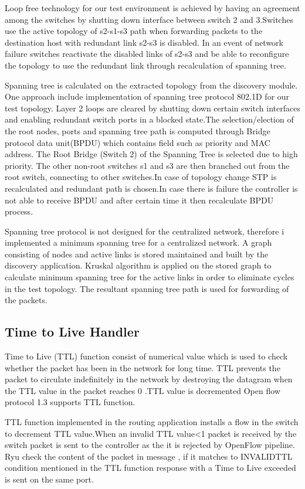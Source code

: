 Loop free technology for our test environment is achieved by having an agreement among the switches by shutting down interface between switch 2 and 3.Switches use the active topology of s2-s1-s3 path when forwarding packets to the destination host with redundant link s2-s3 is disabled. In an event of network failure switches reactivate the disabled links of s2-s3 and be able to reconfigure the topology to use the redundant link through recalculation of spanning tree.

Spanning tree is calculated on the extracted topology from the discovery module. One approach include implementation of spanning tree protocol 802.1D for our test topology. Layer 2 loops are cleared by shutting down certain switch interfaces and enabling redundant switch ports in a blocked state.The selection/election of the root nodes, ports and spanning tree path is computed through Bridge protocol data unit(BPDU) which contains field such as priority and MAC address. The Root Bridge (Switch 2) of the Spanning Tree is selected due to high priority. The other non-root switches s1 and s3 are then branched out from the root switch, connecting to other switches.In case of topology change STP is recalculated and redundant path is chosen.In case there is failure the controller is not able to receive BPDU and after certain time it then recalculate BPDU process.

Spanning tree protocol is not designed for the centralized network, therefore i implemented a minimum spanning tree for a centralized network. A graph consisting of nodes and active links is stored maintained and built by the discovery application. Kruskal algorithm is applied on the stored graph to calculate minimum spanning tree for the active links in order to eliminate cycles in the test topology. The resultant spanning tree path is used for forwarding of the packets.


\subsection{Time to Live Handler}

Time to Live (TTL) function consist of numerical value which is used to check whether the packet has been in the network for long time. TTL prevents the packet to circulate indefinitely in the network by destroying the datagram when the TTL value in the packet reaches 0 .TTL value is decremented Open flow protocol 1.3 supports TTL function.

TTL function implemented in the routing application installs a flow in the switch to decrement TTL value.When an invalid TTL value<1 packet is received by the switch packet is sent to the controller as the it is rejected by OpenFlow pipeline. Ryu check the content of the packet in message , if it matches to INVALIDTTL condition mentioned in the TTL function response with a Time to Live exceeded is sent on the same port. 

